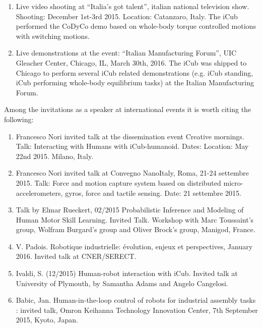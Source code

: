 \begin{enumerate}

\item Live video shooting at ``Italia's got talent'', italian national television show. Shooting: December 1st-3rd 2015. Location: Catanzaro, Italy. The iCub performed the CoDyCo demo based on whole-body torque controlled motions with switching motions.

\item Live demonstrations at the event: ``Italian Manufacturing Forum'', UIC Gleacher Center, Chicago, IL, March 30th, 2016. The iCub was shipped to Chicago to perform several iCub related demonstrations (e.g. iCub standing, iCub performing whole-body equilibrium tasks) at the Italian Manufacturing Forum. 

\end{enumerate} 

Among the invitations as a speaker at international events it is worth citing the following:

\begin{enumerate}

\item Francesco Nori invited talk at the dissemination event Creative mornings. Talk: Interacting with Humans with iCub-humanoid. Dates: Location: May 22nd 2015. Milano, Italy.

\item Francesco Nori invited talk at Convegno NanoItaly, Roma, 21-24 settembre 2015. Talk: Force and motion capture system
based on distributed micro-accelerometers, gyros, force and tactile sensing. Date: 21 settembre 2015.

\item Talk by Elmar Rueckert, 02/2015 Probabilistic Inference and Modeling of Human Motor Skill Learning. Invited Talk. Workshop with Marc Toussaint’s group, Wolfram Burgard’s group and Oliver Brock’s group, Manigod, France.

\item  V. Padois. Robotique industrielle: évolution, enjeux et perspectives, January 2016. Invited talk at CNER/SERECT.

\item  Ivaldi, S. (12/2015) Human-robot interaction with iCub. Invited talk at University of Plymouth, by Samantha Adams and Angelo Cangelosi.

\item Babic, Jan. Human-in-the-loop control of robots for industrial assembly tasks : invited talk, Omron Keihanna Technology Innovation Center, 7th September 2015, Kyoto, Japan.

\end{enumerate} 

